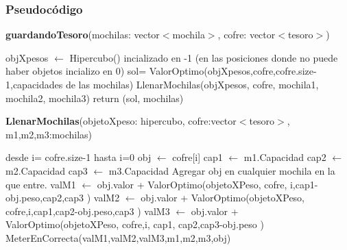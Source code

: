 \documentclass[spanish,12pt]{article}
\begin{document}
\subsubsection{Pseudocódigo}

\begin{algorithm}[H]{\textbf{guardandoTesoro}(mochilas: vector$<$mochila$>$, cofre: vector$<$tesoro$>$)}
	\begin{algorithmic}[1]
		\State objXpesos $\gets$ Hipercubo() incializado en -1 \Comment (en las posiciones donde no puede haber objetos incializo en 0) %
		\State sol= ValorOptimo(objXpesos,cofre,cofre.size-1,capacidades de las mochilas)
		\State LlenarMochilas(objXpesos, cofre, mochila1, mochila2, mochila3)
		\State return (sol, mochilas)
	\end{algorithmic}
\end{algorithm}



\begin{algorithm}[H]{\textbf{LlenarMochilas}(objetoXpeso: hipercubo, cofre:vector$<$tesoro$>$, m1,m2,m3:mochilas)}
	\begin{algorithmic}[1]
		\State desde i= cofre.size-1 hasta i=0
			\State obj $\gets$ cofre[i]
			\State cap1 $\gets$ m1.Capacidad
			\State cap2 $\gets$ m2.Capacidad
			\State cap3 $\gets$ m3.Capacidad
				\State Agregar obj en cualquier mochila en la que entre.
			\Else
				\State valM1 $\gets$ obj.valor + ValorOptimo(objetoXPeso, cofre, i,cap1-obj.peso,cap2,cap3 )
				\State valM2 $\gets$ obj.valor + ValorOptimo(objetoXPeso, cofre,i,cap1,cap2-obj.peso,cap3 )
				\State valM3 $\gets$ obj.valor + ValorOptimo(objetoXPeso, cofre,i, cap1, cap2,cap3-obj.peso )
				\State MeterEnCorrecta(valM1,valM2,valM3,m1,m2,m3,obj)
			\EndIf

	\end{algorithmic}
\end{algorithm}



\end{document}
